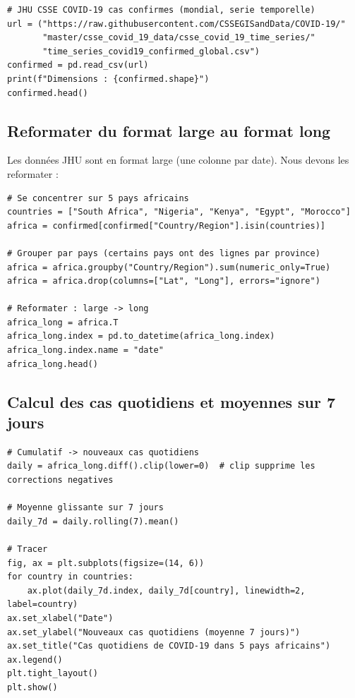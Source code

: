 \begin{verbatim}
# JHU CSSE COVID-19 cas confirmes (mondial, serie temporelle)
url = ("https://raw.githubusercontent.com/CSSEGISandData/COVID-19/"
       "master/csse_covid_19_data/csse_covid_19_time_series/"
       "time_series_covid19_confirmed_global.csv")
confirmed = pd.read_csv(url)
print(f"Dimensions : {confirmed.shape}")
confirmed.head()
\end{verbatim}

\subsection{Reformater du format large au format long}

Les donn\'ees JHU sont en format large (une colonne par date). Nous devons les reformater :

\begin{verbatim}
# Se concentrer sur 5 pays africains
countries = ["South Africa", "Nigeria", "Kenya", "Egypt", "Morocco"]
africa = confirmed[confirmed["Country/Region"].isin(countries)]

# Grouper par pays (certains pays ont des lignes par province)
africa = africa.groupby("Country/Region").sum(numeric_only=True)
africa = africa.drop(columns=["Lat", "Long"], errors="ignore")

# Reformater : large -> long
africa_long = africa.T
africa_long.index = pd.to_datetime(africa_long.index)
africa_long.index.name = "date"
africa_long.head()
\end{verbatim}

\subsection{Calcul des cas quotidiens et moyennes sur 7 jours}

\begin{verbatim}
# Cumulatif -> nouveaux cas quotidiens
daily = africa_long.diff().clip(lower=0)  # clip supprime les corrections negatives

# Moyenne glissante sur 7 jours
daily_7d = daily.rolling(7).mean()

# Tracer
fig, ax = plt.subplots(figsize=(14, 6))
for country in countries:
    ax.plot(daily_7d.index, daily_7d[country], linewidth=2, label=country)
ax.set_xlabel("Date")
ax.set_ylabel("Nouveaux cas quotidiens (moyenne 7 jours)")
ax.set_title("Cas quotidiens de COVID-19 dans 5 pays africains")
ax.legend()
plt.tight_layout()
plt.show()
\end{verbatim}

